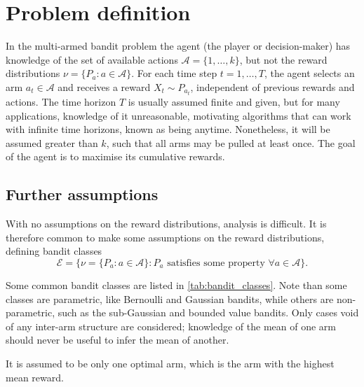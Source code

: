 \section{Problem definition}
In the multi-armed bandit problem the agent (the player or decision-maker) has knowledge of the set of available actions $\mathcal{A}=\{1, \dots, k\}$, but not the reward distributions $\nu = \{P_a : a \in \mathcal{A}\}$.
For each time step $t=1, \dots, T$, the agent selects an arm $a_t \in \mathcal{A}$ and receives a reward $X_t \sim P_{a_t}$, independent of previous rewards and actions.
The time horizon $T$ is usually assumed finite and given, but for many applications, knowledge of it unreasonable, motivating algorithms that can work with infinite time horizons, known as being anytime.
Nonetheless, it will be assumed greater than $k$, such that all arms may be pulled at least once.
The goal of the agent is to maximise its cumulative rewards.

\subsection{Further assumptions}
With no assumptions on the reward distributions, analysis is difficult.
It is therefore common to make some assumptions on the reward distributions, defining bandit classes
\begin{equation}
    \mathcal{E} = \{\nu = \{P_a : a \in \mathcal{A}\} : P_a \text{ satisfies some property } \forall a \in \mathcal{A}\}.
\end{equation}

Some common bandit classes are listed in \cref{tab:bandit_classes}.
Note than some classes are parametric, like Bernoulli and Gaussian bandits, while others are non-parametric, such as the sub-Gaussian and bounded value bandits.
Only cases void of any inter-arm structure are considered; knowledge of the mean of one arm should never be useful to infer the mean of another.

It is assumed to be only one optimal arm, which is the arm with the highest mean reward.


